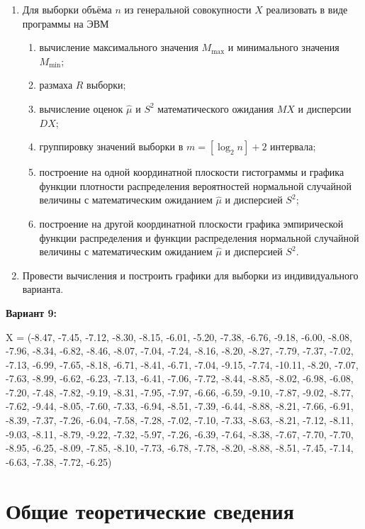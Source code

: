 \documentclass[12pt]{report}
\begin{document}
\begin{enumerate}
	\item Для выборки объёма $n$ из генеральной совокупности $X$ реализовать в виде программы на ЭВМ
	\begin{enumerate}
		\item вычисление максимального значения $M_{\max}$ и минимального значения $M_{\min}$;
		\item размаха $R$ выборки;
		\item вычисление оценок $\hat\mu$ и $S^2$ математического ожидания $MX$ и дисперсии $DX$;
		\item группировку значений выборки в $m = [\log_2 n] + 2$ интервала;
		\item построение на одной координатной плоскости гистограммы и графика функции плотности распределения вероятностей нормальной случайной величины с математическим ожиданием $\hat{\mu}$ и дисперсией $S^2$;
		\item построение на другой координатной плоскости графика эмпирической функции распределения и функции распределения нормальной случайной величины с математическим ожиданием $\hat{\mu}$ и дисперсией $S^2$.
	\end{enumerate}
	\item Провести вычисления и построить графики для выборки из индивидуального варианта.
\end{enumerate}

\textbf{Вариант 9:}

X = (-8.47, -7.45, -7.12, -8.30, -8.15, -6.01, -5.20, -7.38, -6.76, -9.18, -6.00, -8.08, -7.96, -8.34, -6.82, -8.46, -8.07, -7.04, -7.24, -8.16, -8.20, -8.27, -7.79, -7.37, -7.02, -7.13, -6.99, -7.65, -8.18, -6.71, -8.41, -6.71, -7.04, -9.15, -7.74, -10.11, -8.20, -7.07, -7.63, -8.99, -6.62, -6.23, -7.13, -6.41, -7.06, -7.72, -8.44, -8.85, -8.02, -6.98, -6.08, -7.20, -7.48, -7.82, -9.19, -8.31, -7.95, -7.97, -6.66, -6.59, -9.10, -7.87, -9.02, -8.77, -7.62, -9.44, -8.05, -7.60, -7.33, -6.94, -8.51, -7.39, -6.44, -8.88, -8.21, -7.66, -6.91, -8.39, -7.37, -7.26, -6.04, -7.58, -7.28, -7.02, -7.10, -7.33, -8.63, -8.21, -7.12, -8.11, -9.03, -8.11, -8.79, -9.22, -7.32, -5.97, -7.26, -6.39, -7.64, -8.38, -7.67, -7.70, -7.70, -8.95, -6.25, -8.09, -7.85, -8.10, -7.73, -6.78, -7.78, -8.20, -8.88, -8.51, -7.45, -7.14, -6.63, -7.38, -7.72, -6.25)

\clearpage

\chapter*{Общие теоретические сведения}
\end{document}
